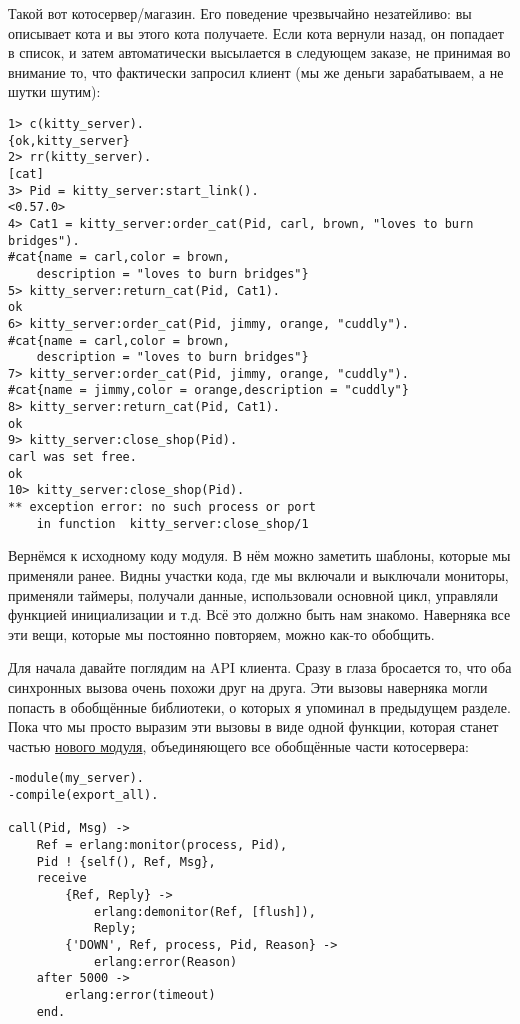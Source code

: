 Такой вот котосервер/магазин.
Его поведение чрезвычайно незатейливо: вы описывает кота и вы этого кота получаете.
Если кота вернули назад, он попадает в список, и затем автоматически высылается в следующем заказе, не принимая во внимание то, что фактически запросил клиент (мы же деньги зарабатываем, а не шутки шутим): \begin{lstlisting}[style=erlang]
1> c(kitty_server). 
{ok,kitty_server}
2> rr(kitty_server).
[cat]
3> Pid = kitty_server:start_link().
<0.57.0>
4> Cat1 = kitty_server:order_cat(Pid, carl, brown, "loves to burn bridges").
#cat{name = carl,color = brown,
    description = "loves to burn bridges"}
5> kitty_server:return_cat(Pid, Cat1).
ok
6> kitty_server:order_cat(Pid, jimmy, orange, "cuddly").
#cat{name = carl,color = brown,
    description = "loves to burn bridges"}
7> kitty_server:order_cat(Pid, jimmy, orange, "cuddly").
#cat{name = jimmy,color = orange,description = "cuddly"}
8> kitty_server:return_cat(Pid, Cat1).
ok
9> kitty_server:close_shop(Pid).
carl was set free.
ok
10> kitty_server:close_shop(Pid).
** exception error: no such process or port
    in function  kitty_server:close_shop/1
\end{lstlisting}

Вернёмся к исходному коду модуля.
В нём можно заметить шаблоны, которые мы применяли ранее.
Видны участки кода, где мы включали и выключали мониторы, применяли таймеры, получали данные, использовали основной цикл, управляли функцией инициализации и т.д.
Всё это должно быть нам знакомо.
Наверняка все эти вещи, которые мы постоянно повторяем, можно как\--то обобщить.

Для начала давайте поглядим на API клиента.
Сразу в глаза бросается то, что оба синхронных вызова очень похожи друг на друга.
Эти вызовы наверняка могли попасть в обобщённые библиотеки, о которых я упоминал в предыдущем разделе.
Пока что мы просто выразим эти вызовы в виде одной функции, которая станет частью \href{http://learnyousomeerlang.com/static/erlang/my\_server.erl}{нового модуля}, объединяющего все обобщённые части котосервера:
\begin{lstlisting}[style=erlang]
-module(my_server).
-compile(export_all).
 
call(Pid, Msg) ->
    Ref = erlang:monitor(process, Pid),
    Pid ! {self(), Ref, Msg},
    receive
        {Ref, Reply} ->
            erlang:demonitor(Ref, [flush]),
            Reply;
        {'DOWN', Ref, process, Pid, Reason} ->
            erlang:error(Reason)
    after 5000 ->
        erlang:error(timeout)
    end.
\end{lstlisting}

